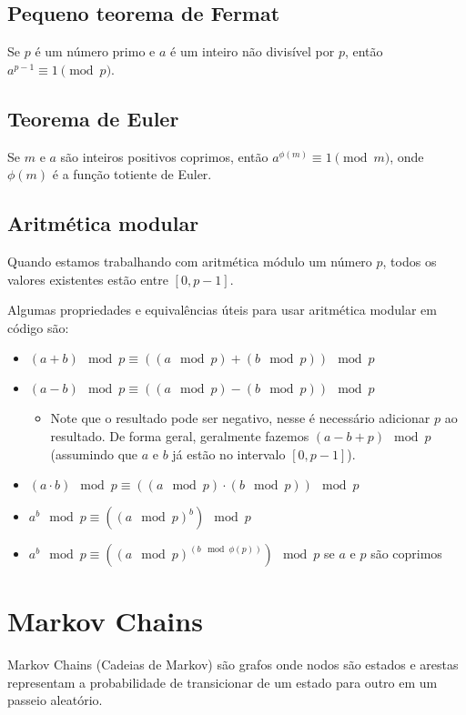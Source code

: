 \documentclass[10pt, a4paper, oneside]{book}
\begin{document}
\subsection{Pequeno teorema de Fermat}

Se $p$ é um número primo e $a$ é um inteiro não divisível por $p$, então $a^{p-1} \equiv 1 \pmod{p}$.

\subsection{Teorema de Euler}

Se $m$ e $a$ são inteiros positivos coprimos, então $a^{\phi(m)} \equiv 1 \pmod{m}$, onde $\phi(m)$ é a função totiente de Euler.

\subsection{Aritmética modular}

Quando estamos trabalhando com aritmética módulo um número $p$, todos os valores existentes estão entre $[0, p-1]$. 

Algumas propriedades e equivalências úteis para usar aritmética modular em código são:

\begin{itemize}
  \item $(a + b) \mod p \equiv ((a \mod p) + (b \mod p)) \mod p$
  \item $(a - b) \mod p \equiv ((a \mod p) - (b \mod p)) \mod p$
  \begin{itemize}
    \item Note que o resultado pode ser negativo, nesse é necessário adicionar $p$ ao resultado. De forma geral, geralmente fazemos $(a - b + p) \mod p$ (assumindo que $a$ e $b$ já estão no intervalo $[0, p-1]$).
  \end{itemize}
  \item $(a \cdot b) \mod p \equiv ((a \mod p) \cdot (b \mod p)) \mod p$
  \item $a^b \mod p \equiv ((a \mod p)^b) \mod p$
  \item $a^b \mod p \equiv ((a \mod p)^{(b \mod \phi(p))}) \mod p$ se $a$ e $p$ são coprimos
\end{itemize}

\section{Markov Chains}

Markov Chains (Cadeias de Markov) são grafos onde nodos são estados e arestas representam a probabilidade de transicionar de um estado para outro em um passeio aleatório.
\end{document}
